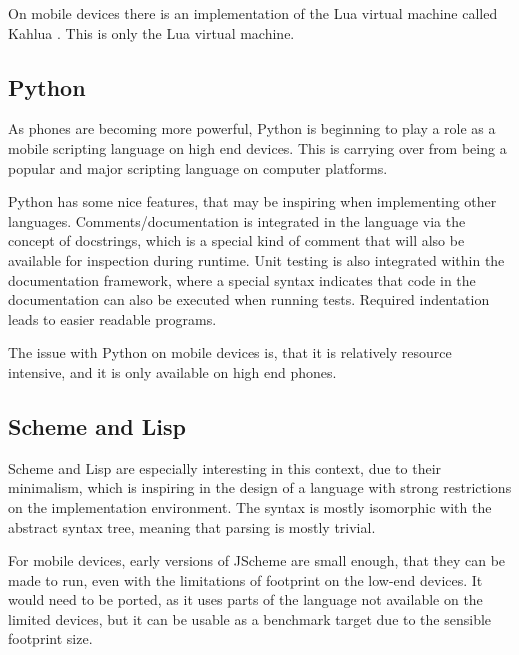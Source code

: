 \documentclass[11pt]{report}
\begin{document}
On mobile devices there is an implementation of the Lua virtual machine called Kahlua \cite{kahlua}.
This is only the Lua virtual machine.

\subsection{Python}
As phones are becoming more powerful, Python is beginning to play a role as a mobile scripting language on high end devices. This is carrying over from being a popular and major scripting language on computer platforms.

Python has some nice features, that may be inspiring when implementing other languages. Comments/documentation is integrated in the language via the concept of docstrings, which is a special kind of comment that will also be available for inspection during runtime. Unit testing is also integrated within the documentation framework, where a special syntax indicates that code in the documentation can also be executed when running tests.
Required indentation leads to easier readable programs.

The issue with Python on mobile devices is, that it is relatively resource intensive, and it is only available on high end phones.

\subsection{Scheme and Lisp}
Scheme and Lisp are especially interesting in this context, due to their minimalism, which is inspiring in the design of a language with strong restrictions on the implementation environment.
The syntax is mostly isomorphic with the abstract syntax tree, meaning that parsing is mostly trivial.

For mobile devices, early versions of JScheme \cite{norvig-jscheme} are small enough, that they can be made to run, even with the limitations of footprint on the low-end devices. It would need to be ported, as it uses parts of the language not available on the limited devices, but it can be usable as a benchmark target due to the sensible footprint size.

\end{document}

